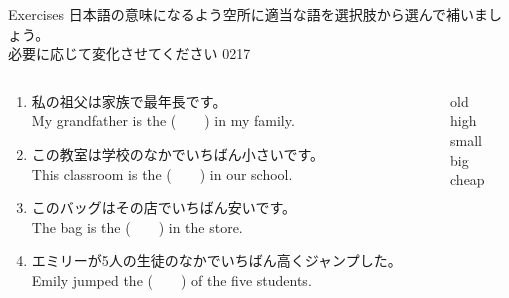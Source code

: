 \documentclass[aspectratio=169,xcolor={dvipsnames,table}]{beamer}
\begin{document}
\begin{frame}[plain]{Exercises}
日本語の意味になるよう空所に適当な語を選択肢から選んで補いましょう。\\必要に応じて変化させてください%
\hfill{\tiny 0217}\,{\scriptsize {}}

\begin{columns}[t]
 \begin{column}{.78\textwidth}
   \begin{enumerate}
  \item 私の祖父は家族で最年長です。\\
	My grandfather is the (~~~~) in my family. 
    \item この教室は学校のなかでいちばん小さいです。\\
	This classroom is the (~~~~) in our school. 
    \item このバッグはその店でいちばん安いです。\\
	The bag is the (~~~~) in the store.
    \item エミリーが5人の生徒のなかでいちばん高くジャンプした。\\
	Emily jumped the (~~~~) of the five students.

\end{enumerate}

 \end{column}
\begin{column}{.2\textwidth}
 \begin{tcolorbox}
  old\\
  high\\
  small\\
  big\\
  cheap
 \end{tcolorbox}
\end{column}
\end{columns}
\end{frame}
\end{document}
